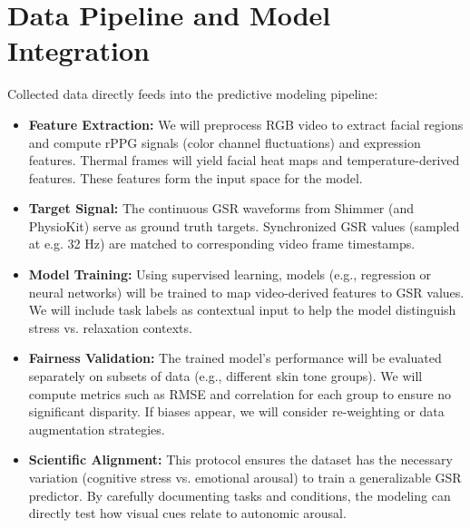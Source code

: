 \section{Data Pipeline and Model Integration}
Collected data directly feeds into the predictive modeling pipeline:
\begin{itemize}
    \item \textbf{Feature Extraction:} We will preprocess RGB video to extract facial regions and compute rPPG signals (color channel fluctuations) and expression features. Thermal frames will yield facial heat maps and temperature-derived features. These features form the input space for the model.
    \item \textbf{Target Signal:} The continuous GSR waveforms from Shimmer (and PhysioKit) serve as ground truth targets. Synchronized GSR values (sampled at e.g. 32 Hz) are matched to corresponding video frame timestamps.
    \item \textbf{Model Training:} Using supervised learning, models (e.g., regression or neural networks) will be trained to map video-derived features to GSR values. We will include task labels as contextual input to help the model distinguish stress vs. relaxation contexts.
    \item \textbf{Fairness Validation:} The trained model’s performance will be evaluated separately on subsets of data (e.g., different skin tone groups). We will compute metrics such as RMSE and correlation for each group to ensure no significant disparity. If biases appear, we will consider re-weighting or data augmentation strategies.
    \item \textbf{Scientific Alignment:} This protocol ensures the dataset has the necessary variation (cognitive stress vs. emotional arousal) to train a generalizable GSR predictor. By carefully documenting tasks and conditions, the modeling can directly test how visual cues relate to autonomic arousal.
\end{itemize}


